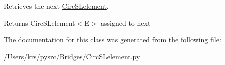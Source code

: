 Retrieves the next \hyperlink{class_bridges_1_1_circ_s_lelement_1_1_circ_s_lelement}{Circ\+S\+Lelement}. 

\begin{DoxyReturn}{Returns}
Circ\+S\+Lelement$<$\+E$>$ assigned to next 
\end{DoxyReturn}


The documentation for this class was generated from the following file\+:\begin{DoxyCompactItemize}
\item 
/\+Users/krs/pysrc/\+Bridges/\hyperlink{_circ_s_lelement_8py}{Circ\+S\+Lelement.\+py}\end{DoxyCompactItemize}

